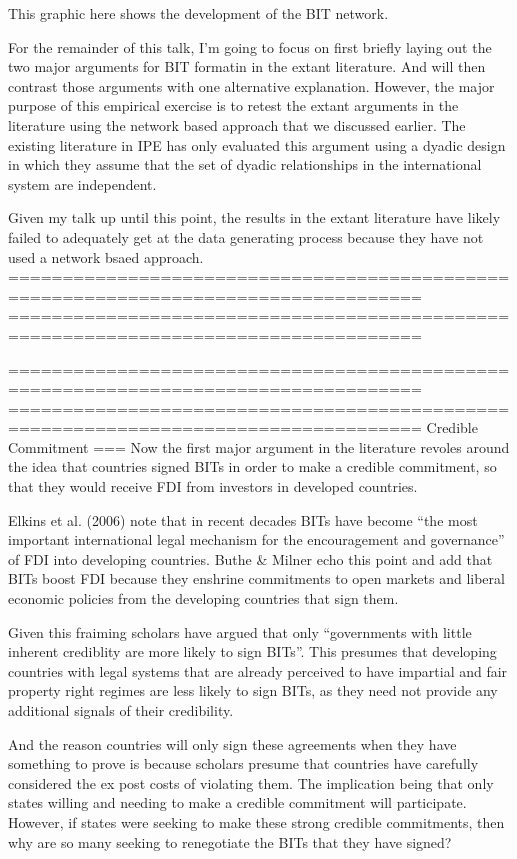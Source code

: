 This graphic here shows the development of the BIT network.

For the remainder of this talk, I'm going to focus on first briefly laying out the two major arguments for BIT formatin in the extant literature. And will then contrast those arguments with one alternative explanation. However, the major purpose of this empirical exercise is to retest the extant arguments in the literature using the network based approach that we discussed earlier. The existing literature in IPE has only evaluated this argument using a dyadic design in which they assume that the set of dyadic relationships in the international system are independent. 

Given my talk up until this point, the results in the extant literature have likely failed to adequately get at the data generating process because they have not used a network bsaed approach.
====================================================================================
====================================================================================

====================================================================================
====================================================================================
Credible Commitment
===
Now the first major argument in the literature revoles around the idea that countries signed BITs in order to make a credible commitment, so that they would receive FDI from investors in developed countries. 

Elkins et al. (2006) note that in recent decades BITs have become “the most important international legal mechanism for the encouragement and governance” of FDI into developing countries. Buthe & Milner echo this point and add that BITs boost FDI because they enshrine commitments to open markets and liberal economic policies from the developing countries that sign them. 

Given this fraiming scholars have argued that only “governments with little inherent crediblity are more likely to sign BITs”. This presumes that developing countries with legal systems that are already perceived to have impartial and fair property right regimes are less likely to sign BITs, as they need not provide any additional signals of their credibility. 

And the reason countries will only sign these agreements when they have something to prove is because scholars presume that countries have carefully considered the ex post costs of violating them. The implication being that only states willing and needing to make a credible commitment will participate. However, if states were seeking to make these strong credible commitments, then why are so many seeking to renegotiate the BITs that they have signed?

